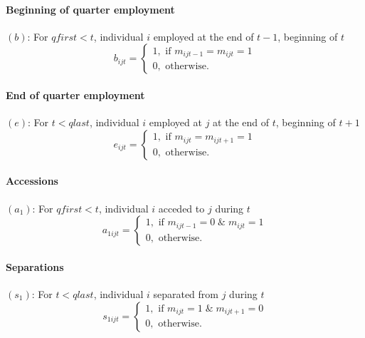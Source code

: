 \paragraph{Beginning of quarter employment}

$\left( b\right) $: For $qfirst<t$, individual $i$ employed at the end of $%
t-1$, beginning of $t$%
\begin{equation}
b_{ijt}=\left\{ 
\begin{array}{l}
1,\text{ if }m_{ijt-1}=m_{ijt}=1 \\ 
0,\text{ otherwise.}%
\end{array}%
\right.  \label{eq:bijt}
\end{equation}

\paragraph{End of quarter employment}

$\left( e\right) $: For $t<qlast$, individual $i$ employed at $j$ at the end
of $t$, beginning of $t+1$%
\begin{equation}
e_{ijt}=\left\{ 
\begin{array}{l}
1,\text{ if }m_{ijt}=m_{ijt+1}=1 \\ 
0,\text{ otherwise.}%
\end{array}%
\right.  \label{eq:eijt}
\end{equation}

\paragraph{Accessions}

$\left( a_{1}\right) $: For $qfirst<t$, individual $i$ acceded to $j$ during 
$t$%
\begin{equation}
a_{1ijt}=\left\{ 
\begin{array}{l}
1,\text{ if }m_{ijt-1}=0\;\&\;m_{ijt}=1 \\ 
0,\text{ otherwise.}%
\end{array}%
\right.  \label{eq:a1ijt}
\end{equation}

\paragraph{Separations}

$\left( s_{1}\right) $: For $t<qlast$, individual $i$ separated from $j$
during $t$%
\begin{equation}
s_{1ijt}=\left\{ 
\begin{array}{l}
1,\text{ if }m_{ijt}=1\;\&\;m_{ijt+1}=0 \\ 
0,\text{ otherwise.}%
\end{array}%
\right.  \label{eq:s1ijt}
\end{equation}

